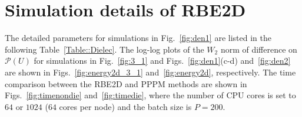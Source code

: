


\section{Simulation details of RBE2D}

The detailed parameters for simulations in Fig.~\ref{fig:den1} are listed in the following Table~\ref{Table::Dielec}.  {The log-log plots of the $W_2$ norm of difference on $\mathscr{P}(U)$ for simulations in Fig.~\ref{fig:3_1} and Figs.~\ref{fig:den1}(c-d) and~\ref{fig:den2} are shown in Figs.~\ref{fig:energy2d_3_1} and~\ref{fig:energy2d}, respectively.}
 {The time comparison between the RBE2D and PPPM methods are shown in Figs.~\ref{fig:timenondie} and~\ref{fig:timedie}, where the number of CPU cores is set to $64$ or $1024$ ($64$ cores per node) and the batch size is $P=200$.}

